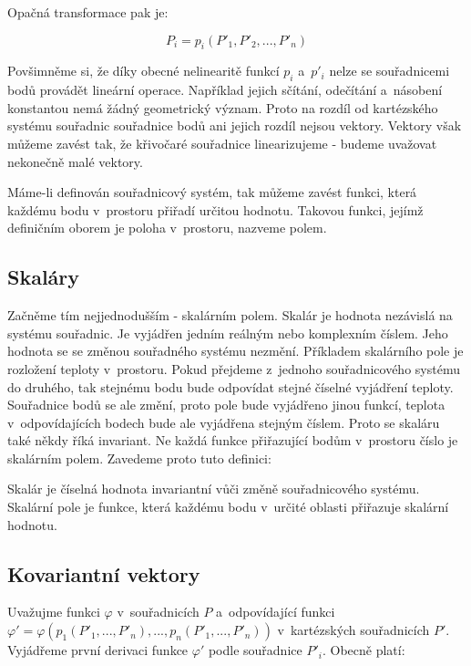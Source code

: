 Opačná transformace pak je:

\begin{equation}
P_i = p_i(P'_1, P'_2, ..., P'_n)
\end{equation}

Povšimněme si, že díky obecné nelinearitě funkcí \(p_i\) a~\(p'_i\) nelze se souřadnicemi bodů provádět lineární operace. Například jejich sčítání, odečítání a~násobení konstantou nemá žádný geometrický význam. Proto na rozdíl od kartézského systému souřadnic souřadnice bodů ani jejich rozdíl nejsou vektory. Vektory však můžeme zavést tak, že křivočaré souřadnice linearizujeme - budeme uvažovat nekonečně malé vektory.

Máme-li definován souřadnicový systém, tak můžeme zavést funkci, která každému bodu v~prostoru přiřadí určitou hodnotu. Takovou funkci, jejímž definičním oborem je poloha v~prostoru, nazveme polem. 

\subsection{Skaláry}

Začněme tím nejjednodušším - skalárním polem. Skalár je hodnota nezávislá na systému souřadnic. Je vyjádřen jedním reálným nebo komplexním číslem. Jeho hodnota se se změnou souřadného systému nezmění. Příkladem skalárního pole je rozložení teploty v~prostoru. Pokud přejdeme z~jednoho souřadnicového systému do druhého, tak stejnému bodu bude odpovídat stejné číselné vyjádření teploty. Souřadnice bodů se ale změní, proto pole bude vyjádřeno jinou funkcí, teplota v~odpovídajících bodech bude ale vyjádřena stejným číslem. Proto se skaláru také někdy říká invariant. Ne každá funkce přiřazující bodům v~prostoru číslo je skalárním polem. Zavedeme proto tuto definici:

\begin{fact}
Skalár je číselná hodnota invariantní vůči změně souřadnicového systému. Skalární pole je funkce, která každému bodu v~určité oblasti přiřazuje skalární hodnotu.
\end{fact}

\subsection{Kovariantní vektory}

Uvažujme funkci \(\varphi\) v~souřadnicích \(P\) a~odpovídající funkci \(\varphi' = \varphi(p_1(P'_1, ..., P'_n), ..., p_n(P'_1, ..., P'_n))\) v~kartézských souřadnicích \(P'\). Vyjádřeme první derivaci funkce \(\varphi'\) podle souřadnice \(P'_i\). Obecně platí:


